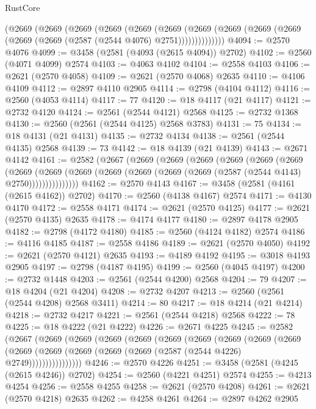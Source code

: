 \begin{lexlean}{RustCore}
\begin{coremodule}
      (@2669
        (@2669
          (@2669
            (@2669
              (@2669
                (@2669
                  (@2669 (@2669 (@2669 (@2669 (@2669 (@2669 (@2587 (@2544 @4076) @2751))))))))))))))
@4094 := @2570 @4076
@4099 := @3458 (@2581 (@4093 (@2615 @4094)) @2702)
@4102 := @2560 (@4071 @4099) @2574
@4103 := @4063 @4102
@4104 := @2558 @4103
@4106 := @2621 (@2570 @4058)
@4109 := @2621 (@2570 @4068) @2635
@4110 := @4106 @4109
@4112 := @2897 @4110 @2905
@4114 := @2798 (@4104 @4112)
@4116 := @2560 (@4053 @4114)
@4117 := 77
@4120 := @18 @4117 (@21 @4117)
@4121 := @2732 @4120
@4124 := @2561 (@2544 @4121) @2568
@4125 := @2732 @1368
@4130 := @2560 (@2561 (@2544 @4125) @2568 @3783)
@4131 := 75
@4134 := @18 @4131 (@21 @4131)
@4135 := @2732 @4134
@4138 := @2561 (@2544 @4135) @2568
@4139 := 73
@4142 := @18 @4139 (@21 @4139)
@4143 := @2671 @4142
@4161 := @2582
    (@2667
      (@2669
        (@2669
          (@2669
            (@2669
              (@2669
                (@2669
                  (@2669
                    (@2669
                      (@2669 (@2669 (@2669 (@2669 (@2669 (@2587 (@2544 @4143) @2750)))))))))))))))
@4162 := @2570 @4143
@4167 := @3458 (@2581 (@4161 (@2615 @4162)) @2702)
@4170 := @2560 (@4138 @4167) @2574
@4171 := @4130 @4170
@4172 := @2558 @4171
@4174 := @2621 (@2570 @4125)
@4177 := @2621 (@2570 @4135) @2635
@4178 := @4174 @4177
@4180 := @2897 @4178 @2905
@4182 := @2798 (@4172 @4180)
@4185 := @2560 (@4124 @4182) @2574
@4186 := @4116 @4185
@4187 := @2558 @4186
@4189 := @2621 (@2570 @4050)
@4192 := @2621 (@2570 @4121) @2635
@4193 := @4189 @4192
@4195 := @3018 @4193 @2905
@4197 := @2798 (@4187 @4195)
@4199 := @2560 (@4045 @4197)
@4200 := @2732 @1448
@4203 := @2561 (@2544 @4200) @2568
@4204 := 79
@4207 := @18 @4204 (@21 @4204)
@4208 := @2732 @4207
@4213 := @2560 (@2561 (@2544 @4208) @2568 @3411)
@4214 := 80
@4217 := @18 @4214 (@21 @4214)
@4218 := @2732 @4217
@4221 := @2561 (@2544 @4218) @2568
@4222 := 78
@4225 := @18 @4222 (@21 @4222)
@4226 := @2671 @4225
@4245 := @2582
    (@2667
      (@2669
        (@2669
          (@2669
            (@2669
              (@2669
                (@2669
                  (@2669
                    (@2669
                      (@2669
                        (@2669
                          (@2669 (@2669 (@2669 (@2669 (@2587 (@2544 @4226) @2749))))))))))))))))
@4246 := @2570 @4226
@4251 := @3458 (@2581 (@4245 (@2615 @4246)) @2702)
@4254 := @2560 (@4221 @4251) @2574
@4255 := @4213 @4254
@4256 := @2558 @4255
@4258 := @2621 (@2570 @4208)
@4261 := @2621 (@2570 @4218) @2635
@4262 := @4258 @4261
@4264 := @2897 @4262 @2905

\end{coremodule}
\end{lexlean}
